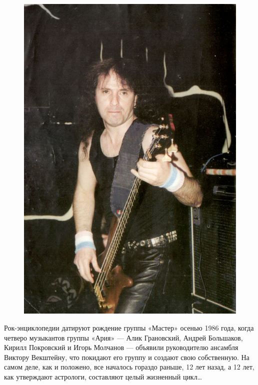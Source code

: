 \documentclass[10pt, twoside]{book}
\begin{document}
\begin{figure}[!ht]
    \centering
    \includegraphics[width=\paperwidth,height=\paperheight]{Cover2}
    \caption*{}
\end{figure}

\restoregeometry

\maketitle

Рок-энциклопедии датируют рождение группы «Мастер» осенью 1986 года, когда четверо музыкантов группы «Ария» — Алик
Грановский, Андрей Большаков, Кирилл Покровский и Игорь Молчанов — объявили руководителю ансамбля Виктору Векштейну,
что покидают его группу и создают свою собственную. На самом деле, как и положено, все началось гораздо раньше, 12 лет
назад, а 12 лет, как утверждают астрологи, составляют целый жизненный цикл\ldots
\end{document}
